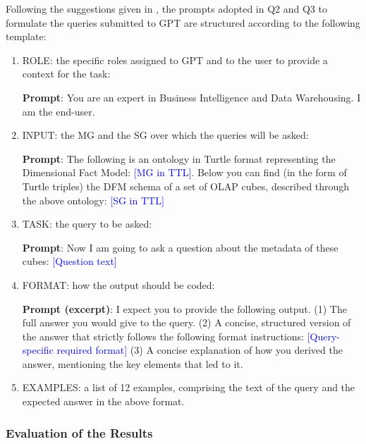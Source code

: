 Following the suggestions given in \cite{DBLP:journals/corr/abs-2305-12138}, the prompts adopted in Q2 and Q3 to formulate the queries submitted to GPT are structured according to the following template:
\begin{enumerate}
        \item ROLE: the specific roles assigned to GPT and to the user to provide a context for the task:
            \begin{shaded} \scriptsize \noindent
                \textbf{Prompt}: You are an expert in Business Intelligence and Data Warehousing. I am the end-user.
            \end{shaded}
        \item INPUT: the MG and the SG over which the queries will be asked:
            \begin{shaded} \scriptsize \noindent
                \textbf{Prompt}: The following is an ontology in Turtle format representing the Dimensional Fact Model: \textcolor{blue}{[MG in TTL]}. Below you can find (in the form of Turtle triples) the DFM schema of a set of OLAP cubes, described through the above ontology: \textcolor{blue}{[SG in TTL]}
            \end{shaded}
        \item TASK: the query to be asked:
            \begin{shaded} \scriptsize \noindent
                \textbf{Prompt}: Now I am going to ask a question about the metadata of these cubes: \textcolor{blue}{[Question text]}
            \end{shaded}
        \item FORMAT: how the output should be coded:
            \begin{shaded}
                \scriptsize \noindent
                \textbf{Prompt (excerpt)}: I expect you to provide the following output. (1) The full answer you would give to the query.
                (2) A concise, structured version of the answer that strictly follows the following format instructions: \textcolor{blue}{[Query-specific required format]}
                (3) A concise explanation of how you derived the answer, mentioning the key elements that led to it.
            \end{shaded}
        \item EXAMPLES: a list of 12 examples, comprising the text of the query and the expected answer in the above format.
\end{enumerate}

\subsubsection{Evaluation of the Results}
\label{sec:llm-metrics}

